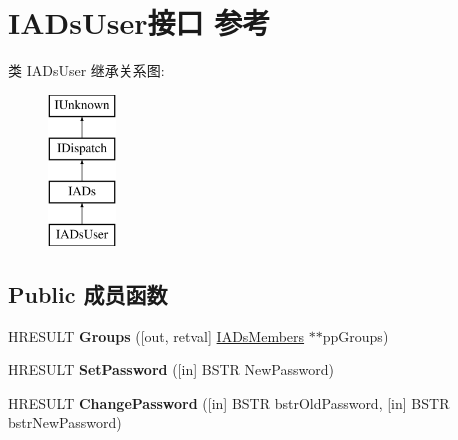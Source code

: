 \hypertarget{interface_i_a_ds_user}{}\section{I\+A\+Ds\+User接口 参考}
\label{interface_i_a_ds_user}
类 I\+A\+Ds\+User 继承关系图\+:\begin{figure}[H]
\begin{center}
\leavevmode
\includegraphics[height=4.000000cm]{interface_i_a_ds_user}
\end{center}
\end{figure}
\subsection*{Public 成员函数}
\begin{DoxyCompactItemize}
\item 
\mbox{\label{interface_i_a_ds_user_abb4bdae65a73ae3b8fec1db1e542acc5}} 
H\+R\+E\+S\+U\+LT {\bfseries Groups} (\mbox{[}out, retval\mbox{]} \hyperlink{interface_i_a_ds_members}{I\+A\+Ds\+Members} $\ast$$\ast$pp\+Groups)
\item 
\mbox{\label{interface_i_a_ds_user_a18b313cc3da5fdc636105cc59153ff88}} 
H\+R\+E\+S\+U\+LT {\bfseries Set\+Password} (\mbox{[}in\mbox{]} B\+S\+TR New\+Password)
\item 
\mbox{\label{interface_i_a_ds_user_aa8f96d09803f18e7d2abcaf34e46336f}} 
H\+R\+E\+S\+U\+LT {\bfseries Change\+Password} (\mbox{[}in\mbox{]} B\+S\+TR bstr\+Old\+Password, \mbox{[}in\mbox{]} B\+S\+TR bstr\+New\+Password)
\end{DoxyCompactItemize}
